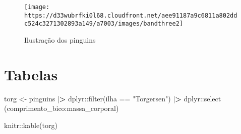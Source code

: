 \documentclass[
]{article}
\newenvironment{Shaded}{\begin{snugshade}}{\end{snugshade}}
\newcommand{\ErrorTok}[1]{\textcolor[rgb]{0.64,0.00,0.00}{\textbf{#1}}}
\newcommand{\FunctionTok}[1]{\textcolor[rgb]{0.00,0.00,0.00}{#1}}
\newcommand{\NormalTok}[1]{#1}
\newcommand{\OtherTok}[1]{\textcolor[rgb]{0.56,0.35,0.01}{#1}}
\newcommand{\SpecialCharTok}[1]{\textcolor[rgb]{0.00,0.00,0.00}{#1}}
\newcommand{\StringTok}[1]{\textcolor[rgb]{0.31,0.60,0.02}{#1}}
\begin{document}
\begin{figure}

{\centering \texttt{[image: https://d33wubrfki0l68.cloudfront.net/aee91187a9c6811a802ddc524c3271302893a149/a7003/images/bandthree2]} 

}

\caption{Ilustração dos pinguins}\label{fig:unnamed-chunk-1}
\end{figure}

\hypertarget{tabelas}{%
\section{Tabelas}\label{tabelas}}

\begin{Shaded}
\begin{Highlighting}[]
\NormalTok{torg }\OtherTok{\textless{}{-}}\NormalTok{ pinguins }\SpecialCharTok{|}\ErrorTok{\textgreater{}}
\NormalTok{  dplyr}\SpecialCharTok{::}\FunctionTok{filter}\NormalTok{(ilha }\SpecialCharTok{==} \StringTok{"Torgersen"}\NormalTok{) }\SpecialCharTok{|}\ErrorTok{\textgreater{}}
\NormalTok{  dplyr}\SpecialCharTok{::}\FunctionTok{select}\NormalTok{ (comprimento\_bico}\SpecialCharTok{:}\NormalTok{massa\_corporal)}

\NormalTok{knitr}\SpecialCharTok{::}\FunctionTok{kable}\NormalTok{(torg)}
\end{Highlighting}
\end{Shaded}
\end{document}
